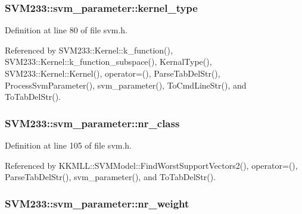 \subsubsection[{\texorpdfstring{kernel\+\_\+type}{kernel_type}}]{ S\+V\+M233\+::svm\+\_\+parameter\+::kernel\+\_\+type}\hypertarget{struct_s_v_m233_1_1svm__parameter_a262be7c9cc8bb14e8bd3476c19eb52dc}{}\label{struct_s_v_m233_1_1svm__parameter_a262be7c9cc8bb14e8bd3476c19eb52dc}


Definition at line 80 of file svm.\+h.



Referenced by S\+V\+M233\+::\+Kernel\+::k\+\_\+function(), S\+V\+M233\+::\+Kernel\+::k\+\_\+function\+\_\+subspace(), Kernal\+Type(), S\+V\+M233\+::\+Kernel\+::\+Kernel(), operator=(), Parse\+Tab\+Del\+Str(), Process\+Svm\+Parameter(), svm\+\_\+parameter(), To\+Cmd\+Line\+Str(), and To\+Tab\+Del\+Str().

\subsubsection[{\texorpdfstring{nr\+\_\+class}{nr_class}}]{ S\+V\+M233\+::svm\+\_\+parameter\+::nr\+\_\+class}\hypertarget{struct_s_v_m233_1_1svm__parameter_a6fa48dd0b10a8f9cbbc8c0d571404345}{}\label{struct_s_v_m233_1_1svm__parameter_a6fa48dd0b10a8f9cbbc8c0d571404345}


Definition at line 105 of file svm.\+h.



Referenced by K\+K\+M\+L\+L\+::\+S\+V\+M\+Model\+::\+Find\+Worst\+Support\+Vectors2(), operator=(), Parse\+Tab\+Del\+Str(), svm\+\_\+parameter(), and To\+Tab\+Del\+Str().

\subsubsection[{\texorpdfstring{nr\+\_\+weight}{nr_weight}}]{ S\+V\+M233\+::svm\+\_\+parameter\+::nr\+\_\+weight}\hypertarget{struct_s_v_m233_1_1svm__parameter_a57a427d9f5046cc6ebd4f67a34c7204a}{}\label{struct_s_v_m233_1_1svm__parameter_a57a427d9f5046cc6ebd4f67a34c7204a}



